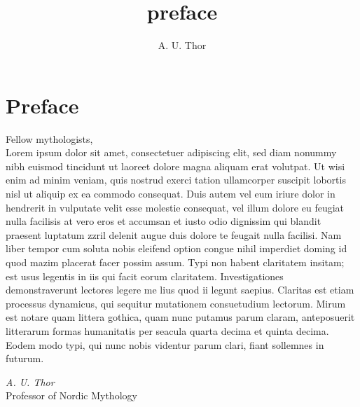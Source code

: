 \author{A. U. Thor}
\title{preface}

	\chapter[{\hspace*{1.5em}\normalfont\textit{A. U. Thor}\newline Preface}]{Preface}
	Fellow mythologists,\\[\baselineskip]
	
	\noindent Lorem ipsum dolor sit amet, consectetuer adipiscing elit, sed diam nonummy nibh euismod tincidunt ut laoreet dolore magna aliquam erat volutpat. Ut wisi enim ad minim veniam, quis nostrud exerci tation ullamcorper suscipit lobortis nisl ut aliquip ex ea commodo consequat. Duis autem vel eum iriure dolor in hendrerit in vulputate velit esse molestie consequat, vel illum dolore eu feugiat nulla facilisis at vero eros et accumsan et iusto odio dignissim qui blandit praesent luptatum zzril delenit augue duis dolore te feugait nulla facilisi. Nam liber tempor cum soluta nobis eleifend option congue nihil imperdiet doming id quod mazim placerat facer possim assum. Typi non habent claritatem insitam; est usus legentis in iis qui facit eorum claritatem. Investigationes demonstraverunt lectores legere me lius quod ii legunt saepius. Claritas est etiam processus dynamicus, qui sequitur mutationem consuetudium lectorum. Mirum est notare quam littera gothica, quam nunc putamus parum claram, anteposuerit litterarum formas humanitatis per seacula quarta decima et quinta decima. Eodem modo typi, qui nunc nobis videntur parum clari, fiant sollemnes in futurum.
	
	\noindent \textit{A. U. Thor}\\
	\noindent Professor of Nordic Mythology
